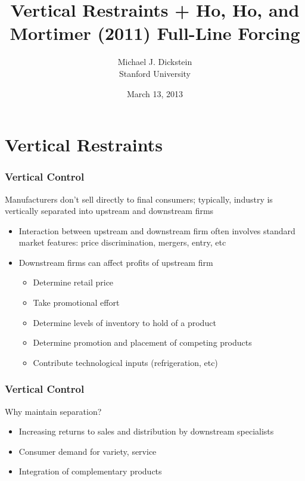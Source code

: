 \documentclass[notes=show]{beamer}
\begin{document}
\title{Vertical Restraints + Ho, Ho, and Mortimer (2011) Full-Line Forcing}
\author[MJ Dickstein]{Michael J. Dickstein \\
Stanford University}
\date[3/13/13]{March 13, 2013}
\maketitle

\section{Vertical Restraints}

\begin{frame}
\frametitle{Vertical Control}

Manufacturers don't sell directly to final consumers; typically, industry is
vertically separated into upstream and downstream firms

\begin{itemize}
\item Interaction between upstream and downstream firm often involves
standard market features: price discrimination, mergers, entry, etc

\item Downstream firms can affect profits of upstream firm

\begin{itemize}
\item Determine retail price

\item Take promotional effort

\item Determine levels of inventory to hold of a product

\item Determine promotion and placement of competing products

\item Contribute technological inputs (refrigeration, etc)
\end{itemize}
\end{itemize}
\end{frame}


\begin{frame}
\frametitle{Vertical Control}

Why maintain separation?

\begin{itemize}
\item Increasing returns to sales and distribution by downstream specialists

\item Consumer demand for variety, service

\item Integration of complementary products
\end{itemize}
\end{frame}
\end{document}
